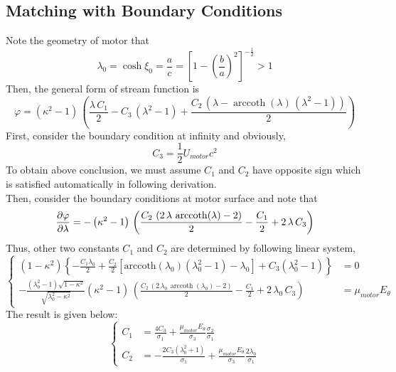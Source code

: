 \documentclass[fontsize=11pt, %
                             paper=a4, %
                             twoside, %
                             captions=tableheading,
                             index=totoc,
                             hyperref]{labbook}
\begin{document}
\subsection{Matching with Boundary Conditions}
Note the geometry of motor that
\begin{equation}
\lambda_0=\cosh\xi_0=\frac{a}{c}=\left[1-\left(\frac{b}{a}\right)^2\right]^{-\frac{1}{2}}>1
\end{equation}
Then, the general form of stream function is
\begin{equation}\label{eqn_streamFunc}
\varphi{} = \left({\kappa{}}^2 - 1\right)\, \left(\frac{\lambda{}\, C_{1}}{2} - C_{3}\, \left({\lambda{}}^2 - 1\right) + \frac{C_{2}\, \left(\lambda{} - \mathop{\mathrm{arccoth}}\nolimits\!\left(\lambda{}\right)\, \left({\lambda{}}^2 - 1\right)\right)}{2}\right)
\end{equation}
First, consider the boundary condition at infinity and obviously,
\begin{equation}
C_3=\frac{1}{2}U_{motor}c^2
\end{equation}
To obtain above conclusion, we must assume $C_1$ and $C_2$ have opposite sign which is satisfied automatically in following derivation.\\
Then, consider the boundary conditions at motor surface and note that
\begin{equation}
\frac{\partial \varphi}{\partial \lambda}=- \left({\kappa{}}^2 - 1\right)\, \left(\frac{C_{2}\, \left(2\, \lambda{}\, \mathop{\mathrm{arccoth}}\nolimits\!\left(\lambda{}\right) - 2\right)}{2} - \frac{C_{1}}{2} + 2\, \lambda{}\, C_{3}\right)
\end{equation}
Thus, other two constants $C_1$ and $C_2$ are determined by following linear system,
\begin{equation}
\left\{
\begin{aligned}
(1-\kappa^2)\left\{-\frac{C_1\lambda_0}{2}+\frac{C_2}{2}\left[\mathrm{arccoth}(\lambda_0)(\lambda_0^2-1)-\lambda_0\right]+C_3(\lambda_0^2-1)\right\}&=0\\
-\frac{(\lambda_0^2-1)\sqrt{1-\kappa^2}}{\sqrt{\lambda_0^2-\kappa^2}} \left({\kappa{}}^2 - 1\right)\, \left(\frac{C_{2}\, \left(2\, \lambda_0{}\, \mathop{\mathrm{arccoth}}\nolimits\!\left(\lambda_0{}\right) - 2\right)}{2} - \frac{C_{1}}{2} + 2\, \lambda_0{}\, C_{3}\right)&=\mu_{motor}E_\theta
\end{aligned}
\right.
\end{equation}
The result is given below:
\begin{equation}
\left\{
\begin{aligned}
C_1&=\frac{4C_3}{\sigma_1}+\frac{\mu_{motor}E_\theta}{\sigma_3}\frac{\sigma_2}{\sigma_1}\\
C_2&=-\frac{2C_3(\lambda_0^2+1)}{\sigma_1}+\frac{\mu_{motor}E_\theta}{\sigma_3}\frac{2\lambda_0}{\sigma_1}
\end{aligned}
\right.
\end{equation}
\end{document}
